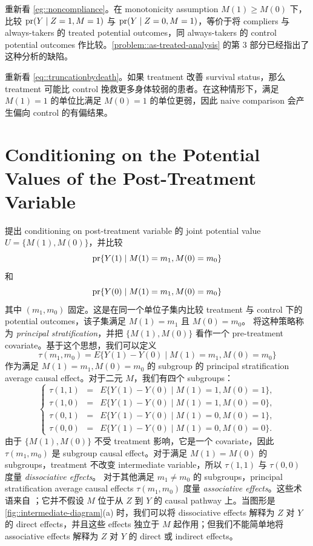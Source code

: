 重新看 \cref{eg::noncompliance}。在 monotonicity assumption $M(1)\geq M(0)$ 下，比较 $\textup{pr}(Y\mid Z=1, M=1)$ 与 $\textup{pr}(Y\mid Z=0, M=1)$，等价于将 compliers 与 always-takers 的 treated potential outcomes，同 always-takers 的 control potential outcomes 作比较。\cref{problem::as-treated-analysis} 的第 3 部分已经指出了这种分析的缺陷。


重新看 \cref{eq::truncationbydeath}。如果 treatment 改善 survival status，那么 treatment 可能比 control 挽救更多身体较弱的患者。在这种情形下，满足 $M(1)=1$ 的单位比满足 $M(0)=1$ 的单位更弱，因此 naive comparison 会产生偏向 control 的有偏结果。

\section{Conditioning on the Potential Values of the Post-Treatment Variable}


\citet{frangakis2002principal} 提出 conditioning on post-treatment variable 的 joint potential value $U = \{ M(1), M(0) \}$，并比较
$$
\textup{pr}\{  Y(1) \mid M(1) = m_1, M(0) = m_0 \}
$$
和
$$
\textup{pr}\{  Y(0) \mid M(1) = m_1, M(0) = m_0 \}
$$
其中 $(m_1,m_0)$ 固定。这是在同一个单位子集内比较 treatment 与 control 下的 potential outcomes，该子集满足 $M(1)=m_1$ 且 $M(0)=m_0$。\citet{frangakis2002principal} 将这种策略称为 {\it principal stratification}，并把 $\{M(1),M(0)\}$ 看作一个 pre-treatment covariate。基于这个思想，我们可以定义
$$
\tau(m_1, m_0) = E\{  Y(1) - Y(0) \mid M(1) = m_1, M(0) = m_0\}
$$
作为满足 $M(1)=m_1, M(0)=m_0$ 的 subgroup 的 principal stratification average causal effect。对于二元 $M$，我们有四个 subgroups：
\begin{equation}
\label{eq::psace}
\left\{ \begin{array}{rcl}
\tau(1,1) &=& E\{  Y(1) - Y(0) \mid M(1) = 1, M(0) =1\} ,\\
\tau(1,0) &=&E\{  Y(1) - Y(0) \mid M(1) = 1, M(0) =0\},\\
\tau(0,1) &=&E\{  Y(1) - Y(0) \mid M(1) = 0, M(0) =1\},\\
\tau(0,0) &=&E\{  Y(1) - Y(0) \mid M(1) = 0, M(0) = 0 \}.
\end{array} 
\right.
\end{equation}
由于 $\{M(1),M(0)\}$ 不受 treatment 影响，它是一个 covariate，因此 $\tau(m_1,m_0)$ 是 subgroup causal effect。对于满足 $M(1)=M(0)$ 的 subgroups，treatment 不改变 intermediate variable，所以 $\tau(1,1)$ 与 $\tau(0,0)$ 度量 {\it dissociative effects}。
对于其他满足 $m_1\neq m_0$ 的 subgroups，principal stratification average causal effects $\tau(m_1,m_0)$ 度量 {\it associative effects}。这些术语来自 \citet{frangakis2002principal}；它并不假设 $M$ 位于从 $Z$ 到 $Y$ 的 causal pathway 上。当图形是 \cref{fig::intermediate-diagram}(a) 时，我们可以将 dissociative effects 解释为 $Z$ 对 $Y$ 的 direct effects，并且这些 effects 独立于 $M$ 起作用；但我们不能简单地将 associative effects 解释为 $Z$ 对 $Y$ 的 direct 或 indirect effects。


